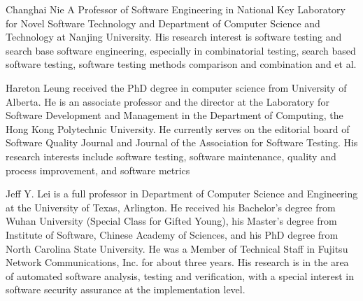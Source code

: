 \documentclass[10pt,journal,compsoc]{IEEEtran}
\begin{document}
\begin{IEEEbiography}{Changhai Nie}
A Professor of Software Engineering in National Key Laboratory for Novel Software Technology and Department of Computer Science and Technology at Nanjing University. His research interest is software testing and search base software engineering, especially in combinatorial testing, search based software testing, software testing methods comparison and combination and et al.
\end{IEEEbiography}

\begin{IEEEbiography}{Hareton Leung}
received the PhD degree in computer science from University of Alberta. He is an associate professor and the director at the Laboratory for Software Development and Management in the Department of Computing, the Hong Kong Polytechnic University. He currently serves on the editorial board of Software Quality Journal and Journal of the Association for Software Testing. His research interests include software testing, software maintenance, quality and process improvement, and software metrics
\end{IEEEbiography}

\begin{IEEEbiography}{Jeff Y. Lei}
is a full professor in Department of Computer Science and Engineering at the University of Texas, Arlington. He received his Bachelor's degree from Wuhan University (Special Class for Gifted Young), his Master's degree from Institute of Software, Chinese Academy of Sciences, and his PhD degree from North Carolina State University. He was a Member of Technical Staff in Fujitsu Network Communications, Inc. for about three years. His research is in the area of automated software analysis, testing and verification, with a special interest in software security assurance at the implementation level.
\end{IEEEbiography}
\end{document}

